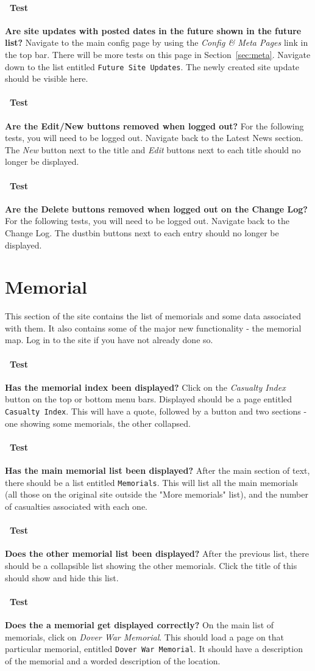 \documentclass[12pt]{article}
\newcounter{Test}
\newcommand{\test}[1]{%
\stepcounter{Test}%
\paragraph{\Circle\ Test \theTest} \textbf{#1} }
\begin{document}
\test{Are site updates with posted dates in the future shown in the future list?}
Navigate to the main config page by using the \textit{Config \& Meta Pages} link in the top bar. There will be more tests on this page in Section~\ref{sec:meta}. Navigate down to the list entitled \texttt{Future Site Updates}. The newly created site update should be visible here.

\test{Are the Edit/New buttons removed when logged out?}
For the following tests, you will need to be logged out. Navigate back to the Latest News section. The \textit{New} button next to the title and \textit{Edit} buttons next to each title should no longer be displayed.

\test{Are the Delete buttons removed when logged out on the Change Log?}
For the following tests, you will need to be logged out. Navigate back to the Change Log. The dustbin buttons next to each entry should no longer be displayed.

\section{Memorial}\label{sec:memorial}
This section of the site contains the list of memorials and some data associated with them. It also contains some of the major new functionality - the memorial map. Log in to the site if you have not already done so.

\test{Has the memorial index been displayed?}
Click on the \textit{Casualty Index} button on the top or bottom menu bars. Displayed should be a page entitled \texttt{Casualty Index}. This will have a quote, followed by a button and two sections - one showing some memorials, the other collapsed.

\test{Has the main memorial list been displayed?}
After the main section of text, there should be a list entitled \texttt{Memorials}. This will list all the main memorials (all those on the original site outside the "More memorials" list), and the number of casualties associated with each one.

\test{Does the other memorial list been displayed?}
After the previous list, there should be a collapsible list showing the other memorials. Click the title of this should show and hide this list.

\test{Does the a memorial get displayed correctly?}
On the main list of memorials, click on \textit{Dover War Memorial}. This should load a page on that particular memorial, entitled \texttt{Dover War Memorial}. It should have a description of the memorial and a worded description of the location.
\end{document}
